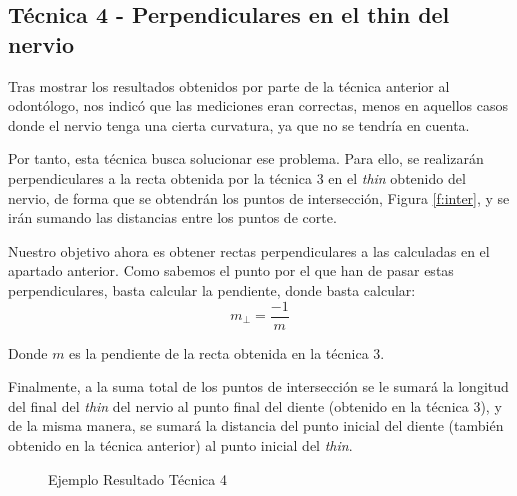 \subsection{Técnica 4 - Perpendiculares en el thin del nervio}
Tras mostrar los resultados obtenidos por parte de la técnica anterior al odontólogo, nos indicó que las mediciones eran correctas, menos en aquellos casos donde el nervio tenga una cierta curvatura, ya que no se tendría en cuenta.

Por tanto, esta técnica busca solucionar ese problema. Para ello, se realizarán perpendiculares a la recta obtenida por la técnica 3 en el \emph{thin} obtenido del nervio, de forma que se obtendrán los puntos de intersección, Figura \ref{f:inter}, y se irán sumando las distancias entre los puntos de corte.

Nuestro objetivo ahora es obtener rectas perpendiculares a las calculadas en el apartado anterior. Como sabemos el punto por el que han de pasar estas perpendiculares, basta calcular la pendiente, donde basta calcular:
$$m_{\perp}=\frac{-1}{m}$$

Donde $m$ es la pendiente de la recta obtenida en la técnica 3. 

Finalmente, a la suma total de los puntos de intersección se le sumará la longitud del final del \emph{thin} del nervio al punto final del diente (obtenido en la técnica 3), y de la misma manera, se sumará la distancia del punto inicial del diente (también obtenido en la técnica anterior) al punto inicial del \emph{thin}.

\begin{figure}[h]
 \centering
 \caption{Ejemplo Resultado Técnica 4}
 \label{f:ejemplo4}
\end{figure}

